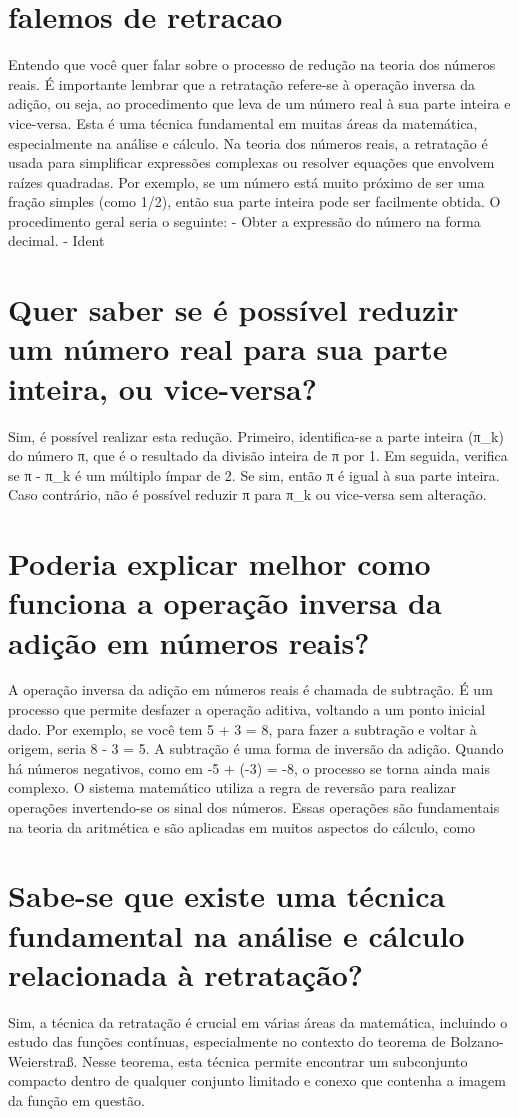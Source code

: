 \documentclass[11pt,a4paper]{article}
\begin{document}
\section{falemos de retracao}
Entendo que você quer falar sobre o processo de redução na teoria dos números reais. É importante lembrar que a retratação refere-se à operação inversa da adição, ou seja, ao procedimento que leva de um número real à sua parte inteira e vice-versa. Esta é uma técnica fundamental em muitas áreas da matemática, especialmente na análise e cálculo. Na teoria dos números reais, a retratação é usada para simplificar expressões complexas ou resolver equações que envolvem raízes quadradas. Por exemplo, se um número está muito próximo de ser uma fração simples (como 1/2), então sua parte inteira pode ser facilmente obtida. O procedimento geral seria o seguinte: - Obter a expressão do número na forma decimal. - Ident

\section{Quer saber se é possível reduzir um número real para sua parte inteira, ou vice-versa?}
Sim, é possível realizar esta redução. Primeiro, identifica-se a parte inteira (π\_k) do número π, que é o resultado da divisão inteira de π por 1. Em seguida, verifica se π - π\_k é um múltiplo ímpar de 2. Se sim, então π é igual à sua parte inteira. Caso contrário, não é possível reduzir π para π\_k ou vice-versa sem alteração.

\section{Poderia explicar melhor como funciona a operação inversa da adição em números reais?}
A operação inversa da adição em números reais é chamada de subtração. É um processo que permite desfazer a operação aditiva, voltando a um ponto inicial dado. Por exemplo, se você tem 5 + 3 = 8, para fazer a subtração e voltar à origem, seria 8 - 3 = 5. A subtração é uma forma de inversão da adição. Quando há números negativos, como em -5 + (-3) = -8, o processo se torna ainda mais complexo. O sistema matemático utiliza a regra de reversão para realizar operações invertendo-se os sinal dos números. Essas operações são fundamentais na teoria da aritmética e são aplicadas em muitos aspectos do cálculo, como

\section{Sabe-se que existe uma técnica fundamental na análise e cálculo relacionada à retratação?}
Sim, a técnica da retratação é crucial em várias áreas da matemática, incluindo o estudo das funções contínuas, especialmente no contexto do teorema de Bolzano-Weierstraß. Nesse teorema, esta técnica permite encontrar um subconjunto compacto dentro de qualquer conjunto limitado e conexo que contenha a imagem da função em questão.
\end{document}

